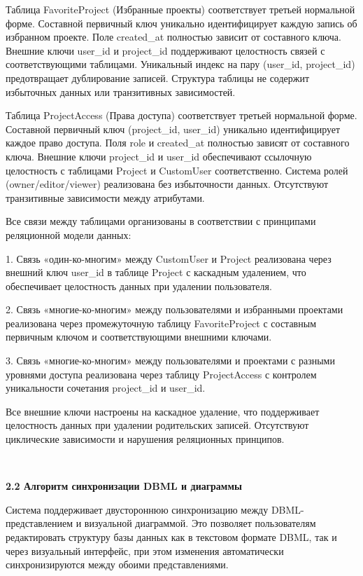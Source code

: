 Таблица FavoriteProject (Избранные проекты) соответствует третьей нормальной форме. Составной первичный ключ уникально идентифицирует каждую запись об избранном проекте. Поле created\_at полностью зависит от составного ключа. Внешние ключи user\_id и project\_id поддерживают целостность связей с соответствующими таблицами. Уникальный индекс на пару (user\_id, project\_id) предотвращает дублирование записей. Структура таблицы не содержит избыточных данных или транзитивных зависимостей.

Таблица ProjectAccess (Права доступа) соответствует третьей нормальной форме. Составной первичный ключ (project\_id, user\_id) уникально идентифицирует каждое право доступа. Поля role и created\_at полностью зависят от составного ключа. Внешние ключи project\_id и user\_id обеспечивают ссылочную целостность с таблицами Project и CustomUser соответственно. Система ролей (owner/editor/viewer) реализована без избыточности данных. Отсутствуют транзитивные зависимости между атрибутами.

Все связи между таблицами организованы в соответствии с принципами реляционной модели данных:

1. Связь «один-ко-многим» между CustomUser и Project реализована через внешний ключ user\_id в таблице Project с каскадным удалением, что обеспечивает целостность данных при удалении пользователя.

2. Связь «многие-ко-многим» между пользователями и избранными проектами реализована через промежуточную таблицу FavoriteProject с составным первичным ключом и соответствующими внешними ключами.

3. Связь «многие-ко-многим» между пользователями и проектами с разными уровнями доступа реализована через таблицу ProjectAccess с контролем уникальности сочетания project\_id и user\_id.

Все внешние ключи настроены на каскадное удаление, что поддерживает целостность данных при удалении родительских записей. Отсутствуют циклические зависимости и нарушения реляционных принципов.

\

\textbf{2.2 Алгоритм синхронизации DBML и диаграммы}

Система поддерживает двустороннюю синхронизацию между DBML-представлением и визуальной диаграммой. Это позволяет пользователям редактировать структуру базы данных как в текстовом формате DBML, так и через визуальный интерфейс, при этом изменения автоматически синхронизируются между обоими представлениями.

